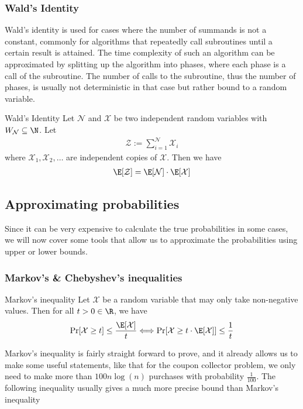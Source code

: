 \subsubsection{Wald's Identity}
Wald's identity is used for cases where the number of summands is not a constant, commonly for algorithms that repeatedly call subroutines until a certain result is attained.
The time complexity of such an algorithm can be approximated by splitting up the algorithm into phases, where each phase is a call of the subroutine.
The number of calls to the subroutine, thus the number of phases, is usually not deterministic in that case but rather bound to a random variable.

\setcounter{all}{65}
\begin{theorem}[]{Wald's Identity}
    Let $\mathcal{N}$ and $\mathcal{X}$ be two independent random variables with $W_{\mathcal{N}} \subseteq \N$. Let
    \begin{align*}
        \mathcal{Z} := \sum_{i = 1}^{\mathcal{N}}\mathcal{X}_i
    \end{align*}
    where $\mathcal{X}_1, \mathcal{X}_2, \ldots$ are independent copies of $\mathcal{X}$. Then we have
    \begin{align*}
        \E[\mathcal{Z}] = \E[\mathcal{N}] \cdot \E[\mathcal{X}]
    \end{align*}
\end{theorem}

\newpage
\subsection{Approximating probabilities}
Since it can be very expensive to calculate the true probabilities in some cases, we will now cover some tools that allow us to approximate the probabilities using upper or lower bounds.

\subsubsection{Markov's \& Chebyshev's inequalities}
\setcounter{all}{67}
\begin{theorem}[]{Markov's inequality}
    Let $\mathcal{X}$ be a random variable that may only take non-negative values. Then for all $t > 0 \in \R$, we have
    \begin{align*}
        \Pr[\mathcal{X} \geq t] \leq \frac{\E[\mathcal{X}]}{t} \Longleftrightarrow \Pr[\mathcal{X} \geq t \cdot \E[\mathcal{X}]] \leq \frac{1}{t}
    \end{align*}
\end{theorem}
Markov's inequality is fairly straight forward to prove, and it already allows us to make some useful statements, like that for the coupon collector problem, we only need to make more than $100 n \log(n)$ purchases with probability $\frac{1}{100}$. The following inequality usually gives a much more precise bound than Markov's inequality

